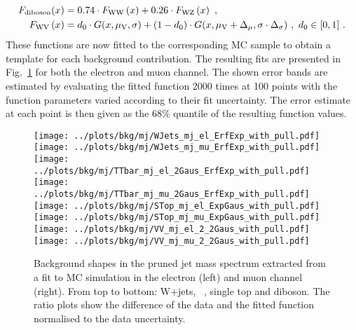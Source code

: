 \begin{align}
F_{\rm diboson}(x) &=  0.74 \cdot F_{\rm WW}\left(x\right) + 0.26 \cdot F_{\rm WZ}\left(x\right) ~,\\
F_{\rm WV}\left(x\right) &=  d_0 \cdot G(x,\mu_{\rm V},\sigma) + (1-d_0) \cdot G(x,\mu_{\rm V}+\Delta_\mu,\sigma\cdot\Delta_\sigma) ~ , ~ d_0 \in [0,1] ~ . 
\end{align}
These functions are now fitted to the corresponding MC sample to obtain a template for each background contribution. The resulting fits are presented in Fig.~\ref{fig:bkg:mjMC} for both the electron and muon channel. The shown error bands are estimated by evaluating the fitted function 2000 times at 100 points with the function parameters varied according to their fit uncertainty. The error estimate at each point is then given as the 68\% quantile of the resulting function values.\\
\begin{figure}
	\centering
		\texttt{[image: ../plots/bkg/mj/WJets\_mj\_el\_ErfExp\_with\_pull.pdf]}
		\texttt{[image: ../plots/bkg/mj/WJets\_mj\_mu\_ErfExp\_with\_pull.pdf]}
		\texttt{[image: ../plots/bkg/mj/TTbar\_mj\_el\_2Gaus\_ErfExp\_with\_pull.pdf]}
		\texttt{[image: ../plots/bkg/mj/TTbar\_mj\_mu\_2Gaus\_ErfExp\_with\_pull.pdf]}
		\texttt{[image: ../plots/bkg/mj/STop\_mj\_el\_ExpGaus\_with\_pull.pdf]}
		\texttt{[image: ../plots/bkg/mj/STop\_mj\_mu\_ExpGaus\_with\_pull.pdf]}
		\texttt{[image: ../plots/bkg/mj/VV\_mj\_el\_2\_2Gaus\_with\_pull.pdf]}
		\texttt{[image: ../plots/bkg/mj/VV\_mj\_mu\_2\_2Gaus\_with\_pull.pdf]}
	\caption[Background shapes in the pruned jet mass spectrum]{Background shapes in the pruned jet mass spectrum extracted from a fit to MC simulation in the electron (left) and muon channel (right). From top to bottom: W+jets, \ttbar \ , single top and diboson. The ratio plots show the difference of the data and the fitted function normalised to the data uncertainty.}
	\label{fig:bkg:mjMC}
\end{figure}

